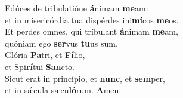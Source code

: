 \oddverse Edúces de tribulatióne \textbf{á}nimam \textbf{me}am:~\*\\
\oddverse et in misericórdia tua dispérdes ini\textbf{mí}cos \textbf{me}os.\\
\evenverse Et perdes omnes, qui tríbulant \textbf{á}nimam \textbf{me}am,~\*\\
\evenverse quóniam ego \textbf{ser}vus \textbf{tu}us sum.\\
\oddverse Glória \textbf{Pa}tri, et \textbf{Fí}lio,~\*\\
\oddverse et Spi\textbf{rí}tui \textbf{San}cto.\\
\evenverse Sicut erat in princípio, et \textbf{nunc}, et \textbf{sem}per,~\*\\
\evenverse et in sǽcula sæcu\textbf{ló}rum. \textbf{A}men.\\
